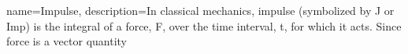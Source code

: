 {
name=Impulse,
    description={In classical mechanics, impulse (symbolized by J or Imp) is the integral of a force, F, over the time interval, t, for which it acts. Since force is a vector quantity}
}
